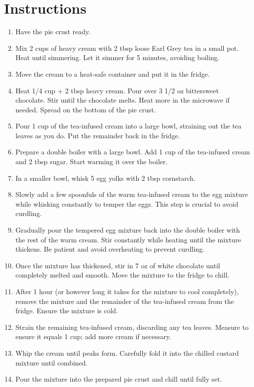 \documentclass[12pt]{article}
\begin{document}
\section*{Instructions}
\begin{enumerate}
    \item Have the pie crust ready.
    \item Mix 2 cups of heavy cream with 2 tbsp loose Earl Grey tea in a small pot. Heat until simmering. Let it simmer for 5 minutes, avoiding boiling.
    \item Move the cream to a heat-safe container and put it in the fridge.
    \item Heat 1/4 cup + 2 tbsp heavy cream. Pour over 3 1/2 oz bittersweet chocolate. Stir until the chocolate melts. Heat more in the microwave if needed. Spread on the bottom of the pie crust.
    \item Pour 1 cup of the tea-infused cream into a large bowl, straining out the tea leaves as you do. Put the remainder back in the fridge.
    \item Prepare a double boiler with a large bowl. Add 1 cup of the tea-infused cream and 2 tbsp sugar. Start warming it over the boiler.
    \item In a smaller bowl, whisk 5 egg yolks with 2 tbsp cornstarch.
    \item Slowly add a few spoonfuls of the warm tea-infused cream to the egg mixture while whisking constantly to temper the eggs. This step is crucial to avoid curdling.
    \item Gradually pour the tempered egg mixture back into the double boiler with the rest of the warm cream. Stir constantly while heating until the mixture thickens. Be patient and avoid overheating to prevent curdling.
    \item Once the mixture has thickened, stir in 7 oz of white chocolate until completely melted and smooth. Move the mixture to the fridge to chill.
    \item After 1 hour (or however long it takes for the mixture to cool completely), remove the mixture and the remainder of the tea-infused cream from the fridge. Ensure the mixture is cold.
    \item Strain the remaining tea-infused cream, discarding any tea leaves. Measure to ensure it equals 1 cup; add more cream if necessary.
    \item Whip the cream until peaks form. Carefully fold it into the chilled custard mixture until combined.
    \item Pour the mixture into the prepared pie crust and chill until fully set.
\end{enumerate}
\end{document}
